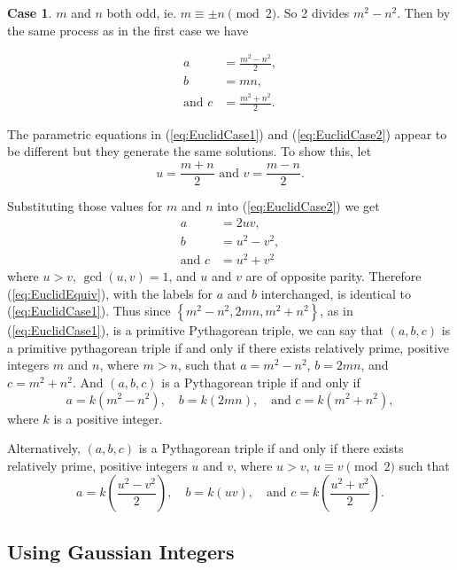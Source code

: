 \documentclass{article}
\theoremstyle{definition}
\newtheorem{case}{Case}[section]
\begin{document}
\begin{case}
\(m\) and \(n\) both odd, ie. \(m\equiv \pm n \pmod{2}\). So 2 divides \(m^2 - n^2\). Then by the same process as in the first case we have

\begin{equation}
\begin{aligned}
a &= \frac{m^2 - n^2}{2}, \\
b &= mn, \\
\text{and } c &= \frac{m^2 + n^2}{2}.
\end{aligned}
\label{eq:EuclidCase2}
\end{equation}
\end{case}

The parametric equations in (\ref{eq:EuclidCase1}) and (\ref{eq:EuclidCase2}) appear to be different but they generate the same solutions. To show this, let \[u = \frac{m + n}{2} \text{ and } v = \frac{m - n}{2}.\]

Substituting those values for \(m\) and \(n\) into (\ref{eq:EuclidCase2}) we get
\begin{equation}
\begin{aligned}
a &= 2uv, \\
b &= u^2 - v^2, \\
\text{and } c &= u^2 + v^2
\end{aligned}
\label{eq:EuclidEquiv}
\end{equation}
where \(u > v\), \(\gcd(u, v) = 1\), and \(u\) and \(v\) are of opposite parity. Therefore (\ref{eq:EuclidEquiv}), with the labels for \(a\) and \(b\) interchanged, is identical to (\ref{eq:EuclidCase1}). Thus since \(\left\{m^2-n^2, 2mn, m^2+n^2\right\}\), as in (\ref{eq:EuclidCase1}), is a primitive Pythagorean triple, we can say that \((a,b,c)\) is a primitive pythagorean triple if and only if there exists relatively prime, positive integers \(m\) and \(n\), where \(m > n\), such that \(a = m^2-n^2\), \(b=2mn\), and \(c = m^2+n^2\). And \((a,b,c)\) is a Pythagorean triple if and only if
\[ a = k(m^2 - n^2), \quad b = k(2mn), \quad\text{and } c = k(m^2 + n^2), \]
where \(k\) is a positive integer.

Alternatively, \((a,b,c)\) is a Pythagorean triple if and only if there exists relatively prime, positive integers \(u\) and \(v\), where \(u > v\), \(u \equiv v \pmod{2}\) such that \[a = k\left(\frac{u^2 - v^2}{2}\right), \quad b = k(uv), \quad\text{and } c = k\left(\frac{u^2 + v^2}{2}\right).\]

\subsection{Using Gaussian Integers}
\label{sec:PTGaussian}
\end{document}
